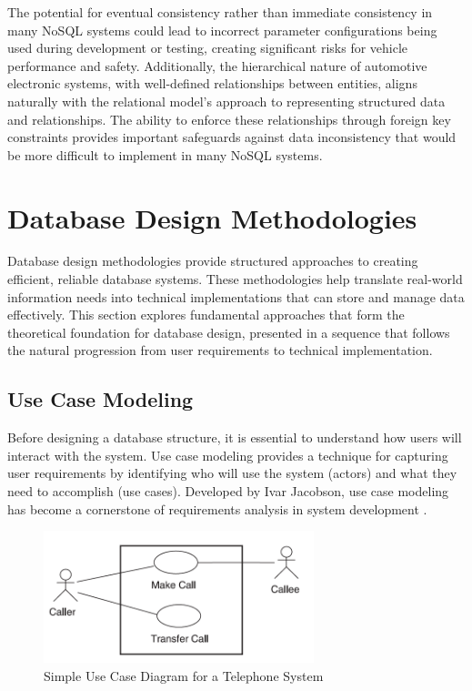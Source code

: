 The potential for eventual consistency rather than immediate consistency in many NoSQL systems could lead to incorrect parameter configurations being used during development or testing, creating significant risks for vehicle performance and safety. Additionally, the hierarchical nature of automotive electronic systems, with well-defined relationships between entities, aligns naturally with the relational model's approach to representing structured data and relationships. The ability to enforce these relationships through foreign key constraints provides important safeguards against data inconsistency that would be more difficult to implement in many NoSQL systems.

\section{Database Design Methodologies}
\label{sec:database-design-methodologies}

Database design methodologies provide structured approaches to creating efficient, reliable database systems. These methodologies help translate real-world information needs into technical implementations that can store and manage data effectively. This section explores fundamental approaches that form the theoretical foundation for database design, presented in a sequence that follows the natural progression from user requirements to technical implementation.

\subsection{Use Case Modeling}
\label{subsec:use-case-modeling}

Before designing a database structure, it is essential to understand how users will interact with the system. Use case modeling provides a technique for capturing user requirements by identifying who will use the system (actors) and what they need to accomplish (use cases). Developed by Ivar Jacobson, use case modeling has become a cornerstone of requirements analysis in system development \cite{jacobson2004use}.

\begin{figure}[ht]
    \centering
    \includegraphics[width=0.7\textwidth]{figures/use_case_diagram.png}
    \caption{Simple Use Case Diagram for a Telephone System}
    \label{fig:use-case-sample}
\end{figure}

